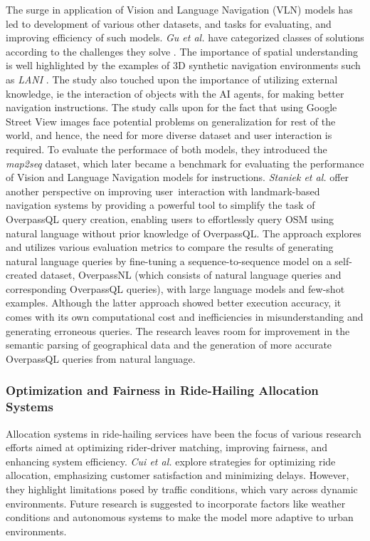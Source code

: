 The surge in application of Vision and Language Navigation (VLN) models has led to development of various other datasets, and tasks for evaluating, and improving efficiency of such models. \textit{Gu et al.} have categorized classes of solutions according to the challenges they solve \cite{gu-2022}. The importance of spatial understanding is well highlighted by the examples of 3D synthetic navigation environments such as \textit{LANI} \cite{misra-etal-2018-mapping}. The study also touched upon the importance of utilizing external knowledge, ie the interaction of objects with the AI agents, for making better navigation instructions. The study calls upon for the fact that using Google Street View images face potential problems on generalization for rest of the world, and hence, the need for more diverse dataset and user interaction is required.
To evaluate the performace of both models, they introduced the \textit{map2seq} dataset, which later became a benchmark for evaluating the performance of Vision and Language Navigation models \cite{schumann-riezler-2022-map2seq-vln} for instructions.
\textit{Staniek et al.} \cite{staniek-2024} offer another perspective on improving user\ interaction with landmark-based navigation systems by providing a powerful tool to simplify the task of OverpassQL query creation, enabling users to effortlessly query OSM using natural language without prior knowledge of OverpassQL. The approach explores and utilizes various evaluation metrics to compare the results of generating natural language queries by fine-tuning a sequence-to-sequence model on a self-created dataset, OverpassNL (which consists of natural language queries and corresponding OverpassQL queries), with large language models and few-shot examples. Although the latter approach showed better execution accuracy, it comes with its own computational cost and inefficiencies in misunderstanding and generating erroneous queries. The research leaves room for improvement in the semantic parsing of geographical data and the generation of more accurate OverpassQL queries from natural language.

\subsubsection*{Optimization and Fairness in Ride-Hailing Allocation Systems}
Allocation systems in ride-hailing services have been the focus of various research efforts aimed at optimizing rider-driver matching, improving fairness, and enhancing system efficiency.
\textit{Cui et al.} \cite{cui-2022} explore strategies for optimizing ride allocation, emphasizing customer satisfaction and minimizing delays. However, they highlight limitations posed by traffic conditions, which vary across dynamic environments. Future research is suggested to incorporate factors like weather conditions and autonomous systems to make the model more adaptive to urban environments.

